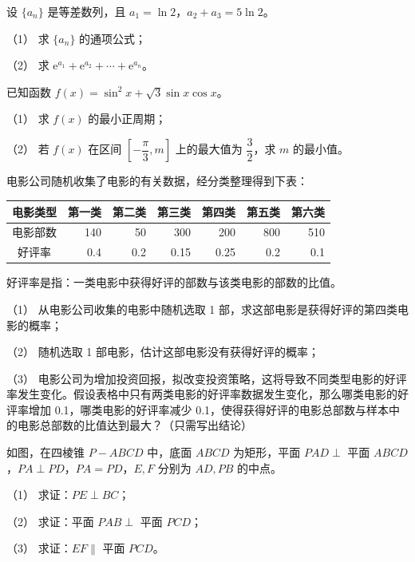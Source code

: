 \begin{question}
设 $\{a_n\}$ 是等差数列，且 $a_1=\ln2$，$a_2+a_3=5\ln2$。

（1） 求 $\{a_n\}$ 的通项公式；

（2） 求 $\mathrm e^{a_1}+\mathrm e^{a_2}+\cdots+\mathrm e^{a_n}$。

\end{question}
\begin{question}
已知函数 $f(x)=\sin^2x+\sqrt3\sin x\cos x$。

（1） 求 $f(x)$ 的最小正周期；

（2） 若 $f(x)$ 在区间 $\left[-\dfrac\pi3,m\right]$ 上的最大值为 $\dfrac32$，求 $m$ 的最小值。

\end{question}
\begin{question}
电影公司随机收集了电影的有关数据，经分类整理得到下表：

\begin{center}
\begin{tabular}{crrrrrr}
\toprule
电影类型 & 第一类 & 第二类 & 第三类 & 第四类 & 第五类 & 第六类 \\
\midrule
电影部数 & 140 & 50 & 300 & 200 & 800 & 510 \\
好评率 & 0.4 & 0.2 & 0.15 & 0.25 & 0.2 & 0.1 \\
\bottomrule
\end{tabular}
\end{center}

好评率是指：一类电影中获得好评的部数与该类电影的部数的比值。

（1） 从电影公司收集的电影中随机选取 1 部，求这部电影是获得好评的第四类电影的概率；

（2） 随机选取 1 部电影，估计这部电影没有获得好评的概率；

（3） 电影公司为增加投资回报，拟改变投资策略，这将导致不同类型电影的好评率发生变化。假设表格中只有两类电影的好评率数据发生变化，那么哪类电影的好评率增加 0.1，哪类电影的好评率减少 0.1，使得获得好评的电影总部数与样本中的电影总部数的比值达到最大？（只需写出结论）

\Needspace{0.4\textheight}
\end{question}
\begin{question}
如图，在四棱锥 $P-ABCD$ 中，底面 $ABCD$ 为矩形，平面 $PAD\perp$ 平面 $ABCD$，$PA\perp PD$，$PA=PD$，$E,F$ 分别为 $AD,PB$ 的中点。
\nopagebreak[4]
\begin{center}\end{center}
\nopagebreak[4]
（1） 求证：$PE\perp BC$；

（2） 求证：平面 $PAB\perp$ 平面 $PCD$；

（3） 求证：$EF\parallel$ 平面 $PCD$。

\end{question}
